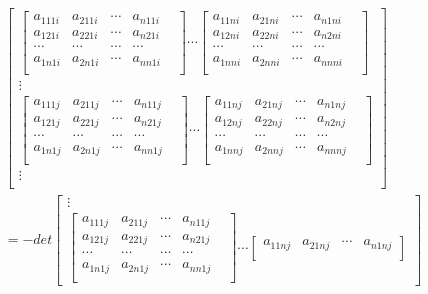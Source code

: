 \documentclass[twoside,a4paper,CCT]{cctart}   %
\begin{document}
\begin{define}
\begin{list}{}
\begin{align*}
\begin{bmatrix}
 \begin{bmatrix}
 a_{111i}& a_{211i}&\cdots&a_{n11i}\\
 a_{121i}& a_{221i}&\cdots&a_{n21i}\\
  \cdots&\cdots&\cdots &\cdots& \\
a_{1n1i}& a_{2n1i}&\cdots&a_{nn1i}\\
\end{bmatrix}
\cdots
\begin{bmatrix}
  a_{11ni}& a_{21ni}&\cdots&a_{n1ni}\\
  a_{12ni}& a_{22ni}&\cdots&a_{n2ni}\\
  \cdots&\cdots&\cdots &\cdots& \\
 a_{1nni}& a_{2nni}&\cdots&a_{nnni}\\
 \end{bmatrix}\\
\vdots\\
\begin{bmatrix}
  a_{111j}& a_{211j}&\cdots&a_{n11j}\\
  a_{121j}& a_{221j}&\cdots&a_{n21j}\\
  \cdots&\cdots&\cdots &\cdots& \\
   a_{1n1j}& a_{2n1j}&\cdots&a_{nn1j}\\
   \end{bmatrix}
\cdots
\begin{bmatrix}
  a_{11nj}& a_{21nj}&\cdots&a_{n1nj}\\
  a_{12nj}& a_{22nj}&\cdots&a_{n2nj}\\
  \cdots&\cdots&\cdots &\cdots& \\
   a_{1nnj }& a_{2nnj}&\cdots&a_{nnnj}\\
   \end{bmatrix}\\
\vdots\\
    \end{bmatrix}\\
=-det
  \begin{bmatrix}
\vdots\\
 \begin{bmatrix}
   a_{111j}& a_{211j}&\cdots&a_{n11j}\\
   a_{121j}& a_{221j}&\cdots&a_{n21j}\\
  \cdots&\cdots&\cdots &\cdots& \\
   a_{1n1j}& a_{2n1j}&\cdots&a_{nn1j}\\
   \end{bmatrix}
\cdots
\begin{bmatrix}
  a_{11nj}& a_{21nj}&\cdots&a_{n1nj}\\

\end{bmatrix}
\end{bmatrix}
\end{align*}
\end{list}
\end{define}
\end{document}
